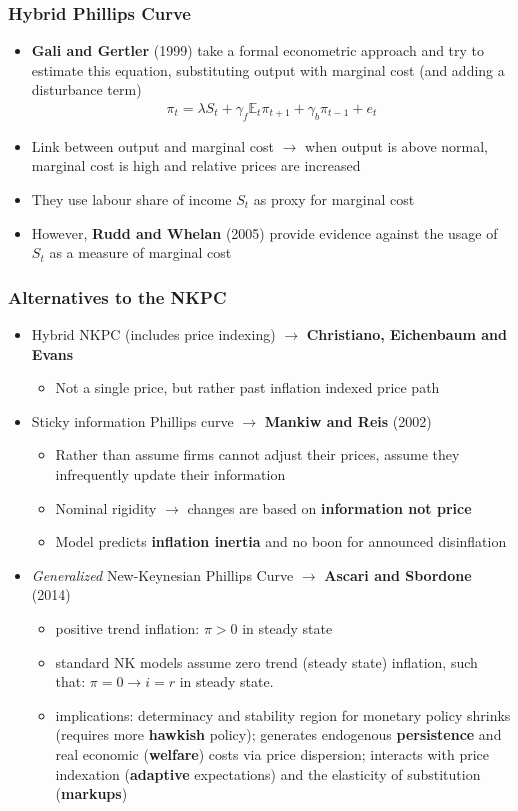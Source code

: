 \documentclass[10pt, xcolor=x11names, table]{beamer}
\begin{document}
\begin{frame}
\frametitle{Hybrid Phillips Curve}
\small
\begin{itemize}
\item \textbf{Gali and Gertler} (1999) take a formal econometric approach and try to estimate this equation, substituting output with marginal cost (and adding a disturbance term)
\begin{align*}
\pi_{t} = \lambda{S_{t}} + \gamma_{f}\mathbb{E}_{t}\pi_{t+1} + \gamma_{b}\pi_{t-1} + e_{t}
\end{align*}
\item Link between output and marginal cost $\rightarrow$ when output is above normal, marginal cost is high and relative prices are increased
\item They use labour share of income $S_{t}$ as proxy for marginal cost
\item However, \textbf{Rudd and Whelan} (2005) provide evidence against the usage of $S_{t}$ as a measure of marginal cost
\end{itemize}
\end{frame}


\begin{frame}
\frametitle{Alternatives to the NKPC}
\begin{itemize}
\item Hybrid NKPC (includes price indexing) $\rightarrow$ \textbf{Christiano, Eichenbaum and Evans}
\begin{itemize}
\item Not a single price, but rather past inflation indexed price path
\end{itemize}
\item Sticky information Phillips curve $\rightarrow$ \textbf{Mankiw and Reis} (2002)
\begin{itemize}
\item Rather than assume firms cannot adjust their prices, assume they infrequently update their information
\item Nominal rigidity $\rightarrow$ changes are based on \textbf{information not price}
\item Model predicts \textbf{inflation inertia} and no boon for announced disinflation
\end{itemize}
\item \textit{Generalized} New-Keynesian Phillips Curve $\rightarrow$ \textbf{Ascari and Sbordone} (2014)
	\begin{itemize}
	\item positive trend inflation: $\pi > 0$ in steady state
	\item standard NK models assume zero trend (steady state) inflation, such that: $\pi=0 \rightarrow i=r$ in steady state.
	\item implications: determinacy and stability region for monetary policy shrinks (requires more \textbf{hawkish} policy); generates endogenous \textbf{persistence} and real economic (\textbf{welfare}) costs via price dispersion; interacts with price indexation (\textbf{adaptive} expectations) and the elasticity of substitution (\textbf{markups})
	\end{itemize}
\end{itemize}
\end{frame}
\end{document}
